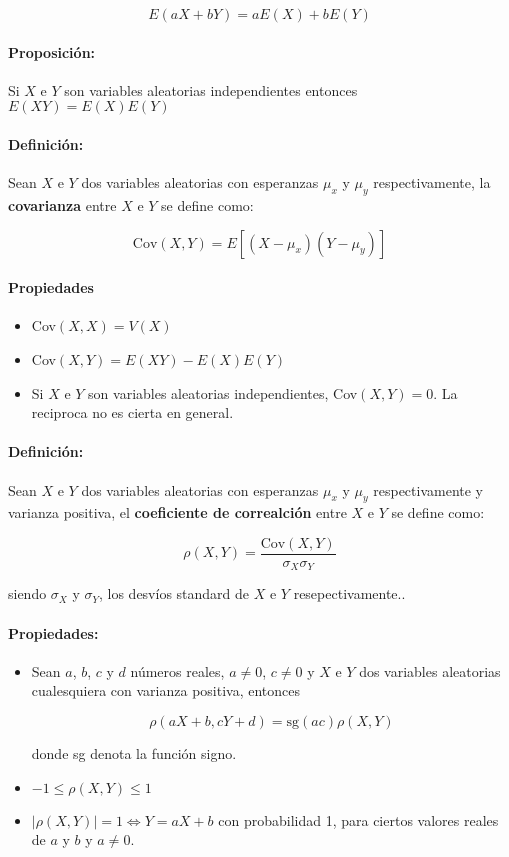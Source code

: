 $$E(aX + bY) = aE(X) + bE(Y)$$

\paragraph{Proposición:} Si $X$ e $Y$ son variables aleatorias independientes entonces $E(XY) = E(X)E(Y)$

\paragraph{Definición:} Sean $X$ e $Y$ dos variables aleatorias con esperanzas $\mu_x$ y $\mu_y$ respectivamente, la \textbf{covarianza} entre $X$ e $Y$ se define como:

$$\text{Cov}(X,Y) = E[(X-\mu_x)(Y-\mu_y)]$$

\paragraph{Propiedades}
\begin{itemize}
	\item Cov$(X,X) = V(X)$
	\item Cov$(X,Y) = E(XY) - E(X)E(Y)$
	\item Si $X$ e $Y$ son variables aleatorias independientes, Cov$(X,Y)=0$. La reciproca no es cierta en general.
\end{itemize}

\paragraph{Definición:} Sean $X$ e $Y$ dos variables aleatorias con esperanzas $\mu_x$ y $\mu_y$ respectivamente y varianza positiva, el \textbf{coeficiente de correalción} entre $X$ e $Y$ se define como:

$$\rho(X,Y) = \frac{\text{Cov}(X,Y)}{\sigma_X\sigma_Y}$$

siendo $\sigma_X$ y $\sigma_Y$, los desvíos standard de $X$ e $Y$ resepectivamente..

\paragraph{Propiedades:}
\begin{itemize}
	\item Sean $a$, $b$, $c$ y $d$ números reales, $a\neq 0$, $c\neq 0$ y $X$ e $Y$ dos variables aleatorias cualesquiera con varianza positiva, entonces
	
	$$\rho(aX+b, cY+d) = \text{sg}(ac)\rho(X,Y)$$
	
	donde sg denota la función signo.
	
	\item $-1\leq \rho(X,Y) \leq 1$
	
	\item $|\rho(X,Y)| = 1 \iff Y = aX + b$ con probabilidad 1, para ciertos valores reales de $a$ y $b$ y $a\neq 0$.
\end{itemize}
